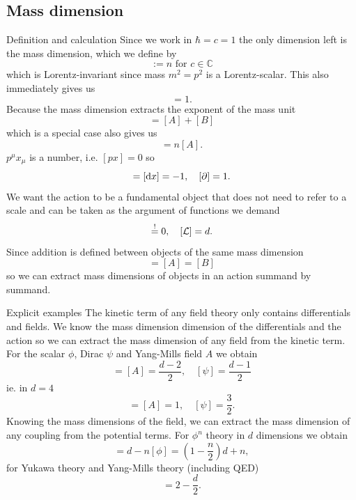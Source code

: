 \subsection{Mass dimension}
\begin{mybox}{Definition and calculation}
	Since we work in $\hbar=c=1$ the only dimension left is the mass dimension, which we define by
	\begin{equation}
		[c(\text{mass unit})^n] :=n \text{ for } c\in \mathbb{C}
	\end{equation}
	which is Lorentz-invariant since mass $m^2=p^2$ is a Lorentz-scalar. This also immediately gives us
	\begin{equation}
		[p]=1.
	\end{equation}
	Because the mass dimension extracts the exponent of the mass unit
	\begin{equation}
	[AB] = [A] + [B]
		\end{equation}
which is a special case also gives us
\begin{equation}
	[A^n] = n [A].
\end{equation}
$p^\mu x_\mu$ is a number, i.e. $[px]=0$ so
\begin{equation}
	[x]=[\md x] = -1,\quad [\partial] =1.
\end{equation}
We want the action to be a fundamental object that does not need to refer to a scale and can be taken as the argument of functions we demand
\begin{equation}
	[S]\stackrel{!}{=}0,\quad [\mL]=d.
\end{equation}
Since addition is defined between objects of the same mass dimension
\begin{equation}
	[A+B] = [A] = [B]
\end{equation}
so we can extract mass dimensions of objects in an action summand by summand.
\end{mybox}
\begin{mybox}{Explicit examples}
The kinetic term of any field theory only contains differentials and fields. We know the mass dimension dimension of the differentials and the action so we can extract the mass dimension of any field from the kinetic term. For the scalar $\phi$, Dirac $\psi$ and Yang-Mills field $A$ we obtain
\begin{equation}
	[\phi] = [A] = \frac{d-2}{2},\quad [\psi] = \frac{d-1}{2}
\end{equation}
ie. in $d=4$
\begin{equation}
[\phi] = [A] =1, \quad [\psi]=\frac{3}{2}.
\end{equation}
Knowing the mass dimensions of the field, we can extract the mass dimension of any coupling from the potential terms. For $\phi^n$ theory in $d$ dimensions we obtain
\begin{equation}
	[\lambda_n] = d-n[\phi] = (1 -\frac{n}{2}) d+n,
\end{equation}
for Yukawa theory and Yang-Mills theory (including QED) 
\begin{equation}
	[g] = 2 - \frac{d}{2}.
\end{equation}
\end{mybox}
